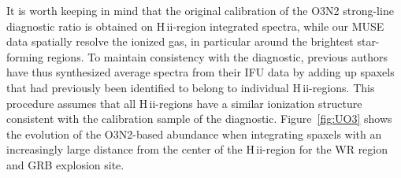 \documentclass[traditabstract]{aa}
\newcommand{\hii}{\mbox{H\,{\sc ii}}}
\begin{document}
\begin{appendix}
It is worth keeping in mind that the original calibration of the O3N2 strong-line diagnostic ratio is obtained on \hii-region integrated spectra, while our MUSE data spatially resolve the ionized gas, in particular around the brightest star-forming regions. To maintain consistency with the diagnostic, previous authors have thus synthesized average spectra from their IFU data by adding up spaxels that had previously been identified to belong to individual \hii-regions. This procedure assumes that all \hii-regions have a similar ionization structure consistent with the calibration sample of the diagnostic. Figure~\ref{fig:UO3} shows the evolution of the O3N2-based abundance when integrating spaxels with an increasingly large distance from the center of the \hii-region for the WR region and GRB explosion site.

\end{appendix}
\end{document}
